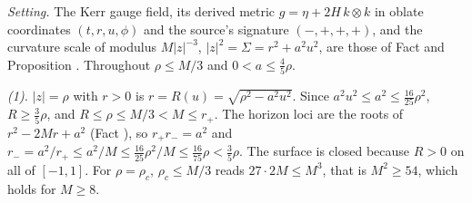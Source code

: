 \emph{Setting.} The Kerr gauge field, its derived metric $g = \eta + 2H\,k\otimes k$ in oblate coordinates $(t, r, u, \phi)$ and the source's signature $(-,+,+,+)$, and the curvature scale of modulus $M|z|^{-3}$, $|z|^{2} = \Sigma = r^{2} + a^{2}u^{2}$, are those of Fact  and Proposition . Throughout $\rho \le M/3$ and $0 < a \le \tfrac45\rho$.

\emph{(1).} $|z| = \rho$ with $r > 0$ is $r = R(u) = \sqrt{\rho^{2} - a^{2}u^{2}}$. Since $a^{2}u^{2} \le a^{2} \le \tfrac{16}{25}\rho^{2}$, $R \ge \tfrac35\rho$, and $R \le \rho \le M/3 < M \le r_{+}$. The horizon loci are the roots of $r^{2} - 2Mr + a^{2}$ (Fact ), so $r_{+}r_{-} = a^{2}$ and $r_{-} = a^{2}/r_{+} \le a^{2}/M \le \tfrac{16}{25}\rho^{2}/M \le \tfrac{16}{75}\rho < \tfrac35\rho$. The surface is closed because $R > 0$ on all of $[-1, 1]$. For $\rho = \rho_{c}$, $\rho_{c} \le M/3$ reads $27\cdot 2M \le M^{3}$, that is $M^{2} \ge 54$, which holds for $M \ge 8$.

